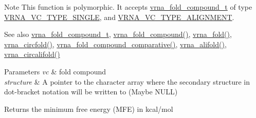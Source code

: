 \begin{DoxyNote}{Note}
This function is polymorphic. It accepts \hyperlink{group__fold__compound_ga1b0cef17fd40466cef5968eaeeff6166}{vrna\+\_\+fold\+\_\+compound\+\_\+t} of type \hyperlink{group__fold__compound_gga01a4ff86fa71deaaa5d1abbd95a1447da1608d3aa78905fc39e0d25a624ac9512}{V\+R\+N\+A\+\_\+\+V\+C\+\_\+\+T\+Y\+P\+E\+\_\+\+S\+I\+N\+G\+L\+E}, and \hyperlink{group__fold__compound_gga01a4ff86fa71deaaa5d1abbd95a1447da056345f1bcfe7cd595d1fd437c05246d}{V\+R\+N\+A\+\_\+\+V\+C\+\_\+\+T\+Y\+P\+E\+\_\+\+A\+L\+I\+G\+N\+M\+E\+N\+T}.
\end{DoxyNote}
\begin{DoxySeeAlso}{See also}
\hyperlink{group__fold__compound_ga1b0cef17fd40466cef5968eaeeff6166}{vrna\+\_\+fold\+\_\+compound\+\_\+t}, \hyperlink{group__fold__compound_ga6601d994ba32b11511b36f68b08403be}{vrna\+\_\+fold\+\_\+compound()}, \hyperlink{group__mfe__fold__single_gae7ca49ffb3086f145da36c964a7cec64}{vrna\+\_\+fold()}, \hyperlink{group__mfe__fold__single_gaa0f5bf321038f404b36a6147bdae4154}{vrna\+\_\+circfold()}, \hyperlink{group__fold__compound_gad6bacc816af274922b13d947f708aa0c}{vrna\+\_\+fold\+\_\+compound\+\_\+comparative()}, \hyperlink{group__consensus__mfe__fold_ga02098d0c8790f9a37fbef6ad0cfc705c}{vrna\+\_\+alifold()}, \hyperlink{group__consensus__mfe__fold_ga01ce2cff93ea44c4f4254760ca2bd16c}{vrna\+\_\+circalifold()}
\end{DoxySeeAlso}

\begin{DoxyParams}{Parameters}
{\em vc} & fold compound \\
\hline
{\em structure} & A pointer to the character array where the secondary structure in dot-\/bracket notation will be written to (Maybe N\+U\+L\+L)\\
\hline
\end{DoxyParams}
\begin{DoxyReturn}{Returns}
the minimum free energy (M\+F\+E) in kcal/mol 
\end{DoxyReturn}
